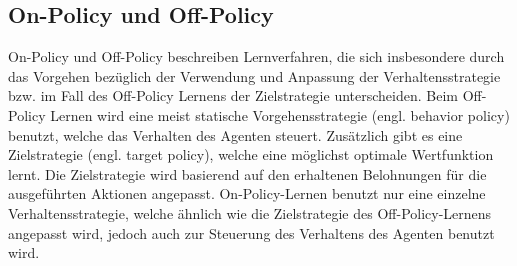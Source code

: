 \subsection{On-Policy und Off-Policy}
On-Policy und Off-Policy beschreiben Lernverfahren, die sich insbesondere durch das Vorgehen bezüglich der Verwendung und Anpassung der Verhaltensstrategie bzw. im Fall des Off-Policy Lernens der Zielstrategie unterscheiden.
Beim Off-Policy Lernen \cite[S. 14]{li2018} wird eine meist statische Vorgehensstrategie (engl. behavior policy) benutzt, welche das Verhalten des Agenten steuert. 
Zusätzlich gibt es eine Zielstrategie (engl. target policy), welche eine möglichst optimale Wertfunktion lernt.
Die Zielstrategie wird basierend auf den erhaltenen Belohnungen für die ausgeführten Aktionen angepasst.
On-Policy-Lernen benutzt nur eine einzelne Verhaltensstrategie, welche ähnlich wie die Zielstrategie des Off-Policy-Lernens angepasst wird, jedoch auch zur Steuerung des Verhaltens des Agenten benutzt wird.